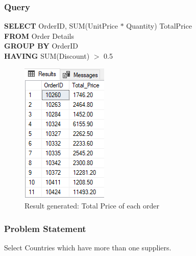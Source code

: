 \documentclass[12pt,a4paper]{report}
\begin{document}
\subsubsection{Query}
\begin{center}
	\begin{minipage}{12cm}
		\textbf{SELECT} OrderID, SUM(UnitPrice $*$ Quantity) TotalPrice \\
		\textbf{FROM} Order Details\\
		\textbf{GROUP BY} OrderID \\
		\textbf{HAVING} SUM(Discount) $>$ 0.5 
	\end{minipage}
	\begin{figure}[h]
	\centering
		\includegraphics[scale=0.7]{images/4.png}
		\caption{Result generated: Total Price of each order}
	\end{figure}
\end{center}

\newpage
\subsubsection{Problem Statement}
Select Countries which have more than one suppliers.
\end{document}
